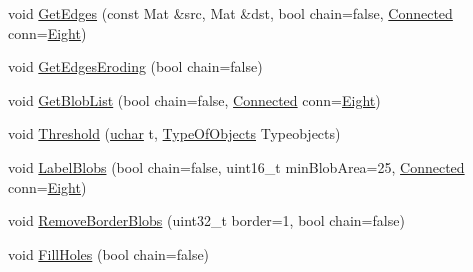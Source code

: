 \begin{DoxyCompactItemize}
\item 
void \hyperlink{class_vision_1_1_segment_a427f6a51ce04127927ae60d8b9ba8e12}{Get\+Edges} (const Mat \&src, Mat \&dst, bool chain=false, \hyperlink{class_vision_1_1_segment_a330240c08320e72270fac0aa83d5e27e}{Connected} conn=\hyperlink{class_vision_1_1_segment_a330240c08320e72270fac0aa83d5e27eae8e2b0fa6d15448f10cddc0390284a39}{Eight})
\item 
void \hyperlink{class_vision_1_1_segment_af4fe7471c44ded04653f8e3f74162c86}{Get\+Edges\+Eroding} (bool chain=false)
\item 
void \hyperlink{class_vision_1_1_segment_a6dba1b8506fe7e8054e99ea5330d4abc}{Get\+Blob\+List} (bool chain=false, \hyperlink{class_vision_1_1_segment_a330240c08320e72270fac0aa83d5e27e}{Connected} conn=\hyperlink{class_vision_1_1_segment_a330240c08320e72270fac0aa83d5e27eae8e2b0fa6d15448f10cddc0390284a39}{Eight})
\item 
void \hyperlink{class_vision_1_1_segment_a1d486dd3b67e1e1208c9ca04be8f6659}{Threshold} (\hyperlink{_soil_math_types_8h_a65f85814a8290f9797005d3b28e7e5fc}{uchar} t, \hyperlink{class_vision_1_1_segment_ac3ddf2c72ee6333007510b680db1e7dd}{Type\+Of\+Objects} Typeobjects)
\item 
void \hyperlink{class_vision_1_1_segment_ac10de08f4c3b0f8cb91f0469b6cf37c9}{Label\+Blobs} (bool chain=false, uint16\+\_\+t min\+Blob\+Area=25, \hyperlink{class_vision_1_1_segment_a330240c08320e72270fac0aa83d5e27e}{Connected} conn=\hyperlink{class_vision_1_1_segment_a330240c08320e72270fac0aa83d5e27eae8e2b0fa6d15448f10cddc0390284a39}{Eight})
\item 
void \hyperlink{class_vision_1_1_segment_a65a50340b5a1a0fb08a1b5749b7145b6}{Remove\+Border\+Blobs} (uint32\+\_\+t border=1, bool chain=false)
\item 
void \hyperlink{class_vision_1_1_segment_a9b1476507a27dbef21acca64efd217b8}{Fill\+Holes} (bool chain=false)
\end{DoxyCompactItemize}
